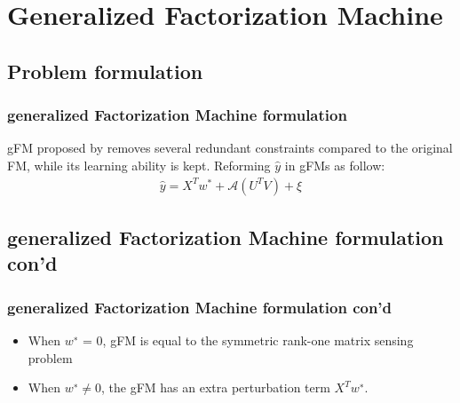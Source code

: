 \documentclass{beamer}
\begin{document}
\section{Generalized Factorization Machine}
\subsection{Problem formulation}
\begin{frame}
\frametitle{generalized Factorization Machine formulation}
  
gFM proposed by \cite{lin2016non} removes several redundant constraints compared to the original FM, while its learning ability is kept. Reforming $\hat{y}$ in gFMs as follow:
\begin{align*}
\hat{y}=X^Tw^*+\mathcal{A}(U^TV)+\xi \label{eq:one_pass_gfm}
\end{align*}

\end{frame}

\subsection{generalized Factorization Machine formulation con'd}
\begin{frame}
\frametitle{generalized Factorization Machine formulation con'd}

\begin{itemize}
\item When $w^∗$ = 0, gFM is equal to the symmetric rank-one
matrix sensing problem
\item When $w^∗ \neq 0$, the gFM has an extra perturbation term $X^Tw^∗$.
\end{itemize}

\end{frame}
\end{document}
